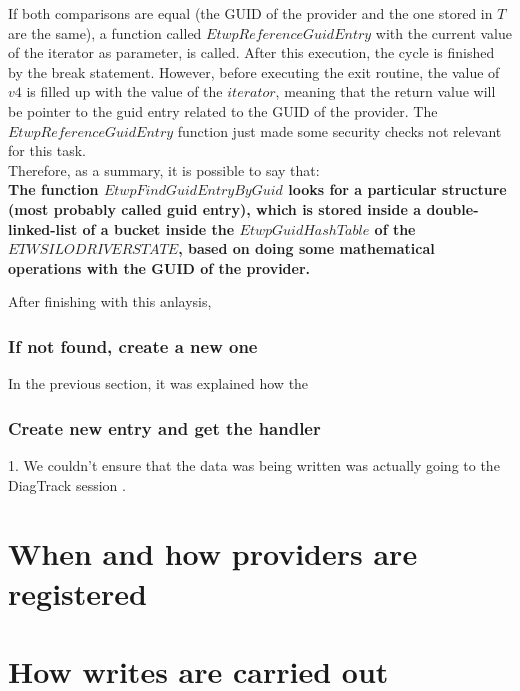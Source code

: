   If both comparisons are equal (the GUID of the provider and the one stored in $T$ are the same), a function called $EtwpReferenceGuidEntry$ with the current value of the iterator as parameter, is called. After this execution, the cycle is finished by the break statement. However, before executing the exit routine, the value of $v4$ is filled up with the value of the $iterator$, meaning that the return value will be pointer to the guid entry related to the GUID of the provider. The $EtwpReferenceGuidEntry$ function just made some security checks not relevant for this task. \\

  Therefore, as a summary, it is possible to say that:\\
  {\bfseries The function $EtwpFindGuidEntryByGuid$ looks for a particular structure (most probably called guid entry), which is stored inside a double-linked-list of a bucket inside the $EtwpGuidHashTable$ of the $ETWSILODRIVERSTATE$, based on doing some mathematical operations with the GUID of the provider.}

  After finishing with this anlaysis, 
  












\subsubsection{If not found, create a new one}
In the previous section, it was explained how the 





\subsubsection{Create new entry and get the handler }

\newpage
{\huge 1. We couldn't ensure that the data was being written was actually going to the DiagTrack session .}

\section{When and how providers are registered}
\section{How writes are carried out}
